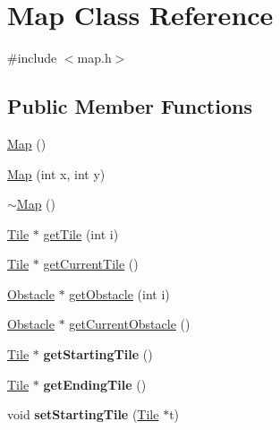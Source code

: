 \hypertarget{class_map}{}\section{Map Class Reference}
\label{class_map}


{\ttfamily \#include $<$map.\+h$>$}

\subsection*{Public Member Functions}
\begin{DoxyCompactItemize}
\item 
\mbox{\hyperlink{class_map_a0f5ad0fd4563497b4214038cbca8b582}{Map}} ()
\item 
\mbox{\hyperlink{class_map_a7dd574b3746a45123fd765945b6a2a7e}{Map}} (int x, int y)
\item 
\mbox{\hyperlink{class_map_aa403fbe09394ccf39747588f5168e3b2}{$\sim$\+Map}} ()
\item 
\mbox{\hyperlink{class_tile}{Tile}} $\ast$ \mbox{\hyperlink{class_map_a60bdbaac9468f1ceb427e38db3eb46a0}{get\+Tile}} (int i)
\item 
\mbox{\hyperlink{class_tile}{Tile}} $\ast$ \mbox{\hyperlink{class_map_aa84b261dd360a64ef6fadfb4c4b1f2ff}{get\+Current\+Tile}} ()
\item 
\mbox{\hyperlink{class_obstacle}{Obstacle}} $\ast$ \mbox{\hyperlink{class_map_a17453848c1ade655219c73c15a9b1b78}{get\+Obstacle}} (int i)
\item 
\mbox{\hyperlink{class_obstacle}{Obstacle}} $\ast$ \mbox{\hyperlink{class_map_a61b2390d5a19071bf3509152872f5ac6}{get\+Current\+Obstacle}} ()
\item 
\mbox{\label{class_map_a6ad7382f42482e46415124c5af3b9c33}} 
\mbox{\hyperlink{class_tile}{Tile}} $\ast$ {\bfseries get\+Starting\+Tile} ()
\item 
\mbox{\label{class_map_a4e5e1640f6520226491b06490f624eb6}} 
\mbox{\hyperlink{class_tile}{Tile}} $\ast$ {\bfseries get\+Ending\+Tile} ()
\item 
\mbox{\label{class_map_a941f348abe63fb43c8a912500a61f2f6}} 
void {\bfseries set\+Starting\+Tile} (\mbox{\hyperlink{class_tile}{Tile}} $\ast$t)
\item 
\mbox{\label{class_map_a88b6d85703a92e96963e6dc6a8042521}} 

\end{DoxyCompactItemize}
